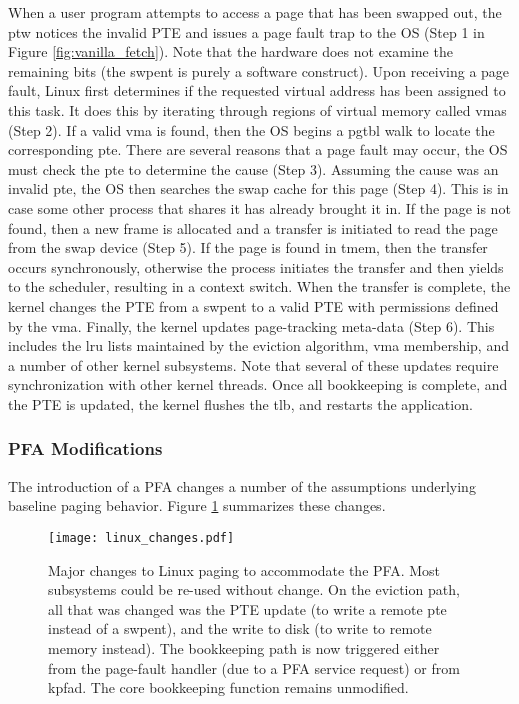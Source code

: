 When a user program attempts to access a page that has been swapped out, the
\gls{ptw} notices the invalid PTE and issues a page fault trap to the OS (Step
1 in Figure \ref{fig:vanilla_fetch}). Note that the hardware does not examine
the remaining bits (the \gls{swpent} is purely a software construct). Upon
receiving a page fault, Linux first determines if the requested virtual address
has been assigned to this task. It does this by iterating through regions of
virtual memory called \glspl{vma} (Step 2). If a valid \gls{vma} is found, then
the OS begins a \gls{pgtbl} walk to locate the corresponding \gls{pte}. There
are several reasons that a page fault may occur, the OS must check the
\gls{pte} to determine the cause (Step 3). Assuming the cause was an invalid
\gls{pte}, the OS then searches the swap cache for this page (Step 4). This is
in case some other process that shares it has already brought it in. If the
page is not found, then a new frame is allocated and a transfer is initiated to
read the page from the swap device (Step 5). If the page is found in
\gls{tmem}, then the transfer occurs synchronously, otherwise the process
initiates the transfer and then yields to the scheduler, resulting in a context
switch. When the transfer is complete, the kernel changes the PTE from a
\gls{swpent} to a valid PTE with permissions defined by the \gls{vma}. Finally,
the kernel updates page-tracking meta-data (Step 6). This includes the \gls{lru} lists
maintained by the eviction algorithm, \gls{vma} membership, and a number of
other kernel subsystems. Note that several of these updates require
synchronization with other kernel threads. Once all bookkeeping is complete,
and the PTE is updated, the kernel flushes the \gls{tlb}, and restarts the
application.

\FloatBarrier 
\subsubsection{PFA Modifications}
The introduction of a PFA changes a number of the assumptions underlying
baseline paging behavior. Figure \ref{fig:linux_changes} summarizes these
changes.

\begin{figure}[h] \centering
  \texttt{[image: linux\_changes.pdf]}
  \caption{Major changes to Linux paging to accommodate the PFA. Most
  subsystems could be re-used without change. On the eviction path, all that
  was changed was the PTE update (to write a remote \gls{pte} instead of a
  \gls{swpent}), and the write to disk (to write to remote memory instead). The
  bookkeeping path is now triggered either from the page-fault handler (due to
  a PFA service request) or from \gls{kpfad}. The core bookkeeping function
remains unmodified.}
  \label{fig:linux_changes}
\end{figure}

